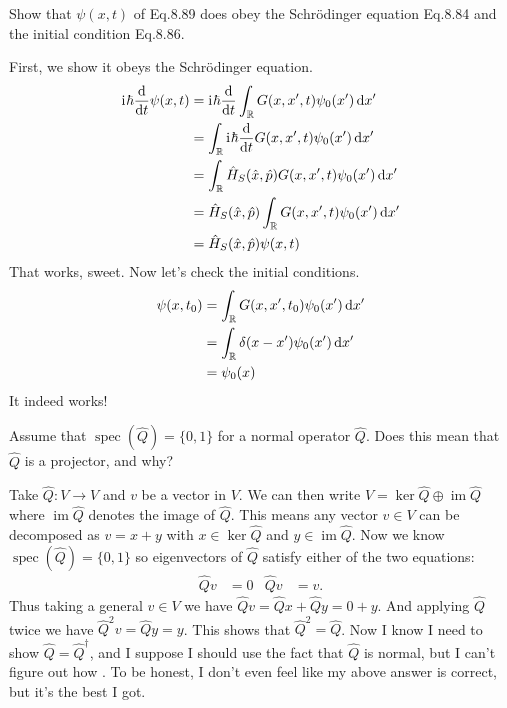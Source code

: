 \documentclass[boxes,pages]{homework}
\makeatletter
\newcommand{\iu}{\mathrm{i}\mkern1mu}
\newcommand{\herm}[1]{{{#1}^\dagger}}
\newcommand{\R}{\mathbb{R}}
\DeclareMathOperator{\spec}{spec}
\DeclareMathOperator{\im}{im}
\numberwithin{@problem}{section}
\makeatother
\begin{document}
\setcounter{section}{8}

\begin{problem}
Show that $\psi(x,t)$ of Eq.8.89 does obey the Schr\"odinger equation Eq.8.84 and the initial condition Eq.8.86.
\end{problem}

\begin{solution}
	First, we show it obeys the Schr\"odinger equation.
	\begin{align*}
		\iu\hbar\dv{t}\psi(x, t) & = \iu\hbar\dv{t}\int_\R\green\psi_0(x')\dd{x'}                \\
		                         & = \int_\R\iu\hbar\dv{t}\green \psi_0(x')\dd{x'}               \\
		                         & = \int_\R \hat{H}_S(\hat{x}, \hat{p})\green \psi_0(x')\dd{x'} \\
		                         & = \hat{H}_S(\hat{x}, \hat{p})\int_\R \green \psi_0(x')\dd{x'} \\
		                         & = \hat{H}_S(\hat{x}, \hat{p})\psi(x, t)
	\end{align*}
	That works, sweet. Now let's check the initial conditions.
	\begin{align*}
		\psi(x, t_0) & = \int_\R\green[t_0]\psi_0(x')\dd{x'}    \\
		             & = \int_\R\delta(x - x')\psi_0(x')\dd{x'} \\
		             & = \psi_0(x)
	\end{align*}
	It indeed works!
\end{solution}

\setcounter{section}{9}

\begin{problem}
Assume that $\spec(\hat{Q}) = \{0,1\}$ for a normal operator $\hat{Q}$. Does this mean that $\hat{Q}$ is a projector, and why?
\end{problem}

\begin{solution}
	Take $\hat{Q}:V\to V$ and $v$ be a vector in $V$. We can then write $V = \ker{\hat{Q}}\oplus \im{\hat{Q}}$ where $\im{\hat{Q}}$ denotes the image of $\hat{Q}$.
	This means any vector $v\in V$ can be decomposed as $v = x + y$ with $x \in \ker{\hat{Q}}$ and $y\in\im{\hat{Q}}$.
	Now we know $\spec(\hat{Q}) = \{0,1\}$ so eigenvectors of $\hat{Q}$ satisfy either of the two equations:
	\begin{align*}
		\hat{Q}v & = 0 & \hat{Q}v & = v.
	\end{align*}
	Thus taking a general $v\in V$ we have $\hat{Q}v = \hat{Q}x + \hat{Q}y = 0 + y$.
	And applying $\hat{Q}$ twice we have $\hat{Q}^2v = \hat{Q}y = y$.
	This shows that $\hat{Q}^2 = \hat{Q}$.
	Now I know I need to show $\hat{Q} = \herm{\hat{Q}}$, and I suppose I should use the fact that $\hat{Q}$ is normal, but I can't figure out how \frownie.
	To be honest, I don't even feel like my above answer is correct, but it's the best I got.
\end{solution}
\end{document}
